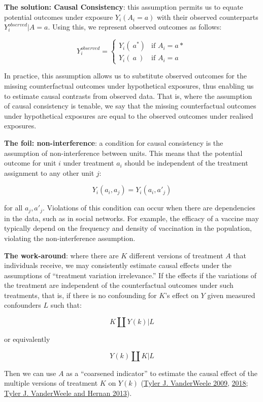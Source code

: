 \documentclass[
  singlecolumn]{report}
\begin{document}
\textbf{The solution: Causal Consistency}: this assumption permits us to
equate potential outcomes under exposure \(Y_i(A_i=a)\) with their
observed counterparts \(Y_i^{observed}|A=a\). Using this, we represent
observed outcomes as follows:

\[
Y^{observed}_i = 
\begin{cases} 
Y_i(~a^*) & \text{if } A_i = a* \\
Y_i(~a~) & \text{if } A_i = a
\end{cases}
\]

In practice, this assumption allows us to substitute observed outcomes
for the missing counterfactual outcomes under hypothetical exposures,
thus enabling us to estimate causal contrasts from observed data. That
is, where the assumption of causal consistency is tenable, we say that
the missing counterfactual outcomes under hypothetical exposures are
equal to the observed outcomes under realised exposures.

\textbf{The foil: non-interference}: a condition for causal consistency
is the assumption of non-interference between units. This means that the
potential outcome for unit \(i\) under treatment \(a_i\) should be
independent of the treatment assignment to any other unit \(j\):

\[
Y_i(a_i, a_j) = Y_i(a_i, a'_j)
\]

for all \(a_j, a'_j\). Violations of this condition can occur when there
are dependencies in the data, such as in social networks. For example,
the efficacy of a vaccine may typically depend on the frequency and
density of vaccination in the population, violating the non-interference
assumption.

\textbf{The work-around}: where there are \(K\) different versions of
treatment \(A\) that individuals receive, we may consistently estimate
causal effects under the assumptions of ``treatment variation
irrelevance.'' If the effects if the variations of the treatment are
independent of the counterfactual outcomes under such treatments, that
is, if there is no confounding for \(K\)'s effect on \(Y\) given
measured confounders \(L\) such that:

\[
K \coprod Y(k) | L
\]

or equivalently

\[
Y(k) \coprod K | L
\]

Then we can use \(A\) as a ``coarsened indicator'' to estimate the
causal effect of the multiple versions of treatment \(K\) on \(Y(k)\)
(\protect\hyperlink{ref-vanderweele2009}{Tyler J. VanderWeele 2009},
\protect\hyperlink{ref-vanderweele2018}{2018};
\protect\hyperlink{ref-vanderweele2013}{Tyler J. VanderWeele and Hernan
2013}).
\end{document}

